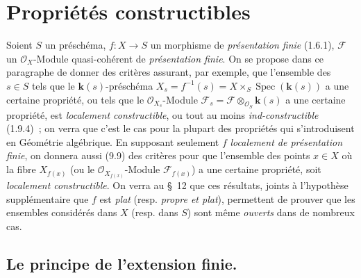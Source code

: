 \section{Propriétés constructibles}
\label{section:IV.9-fr}

Soient $S$ un préschéma, $f:X\to S$ un morphisme de
\emph{présentation finie} (1.6.1), $\mathcal F$ un $\mathcal O_X$-Module
quasi-cohérent de \emph{présentation finie}. On se propose dans ce paragraphe
de donner des critères assurant, par exemple, que l'ensemble des $s\in S$ tels
que le $\boldsymbol{k}(s)$-préschéma
$X_s=f^{-1}(s)=X\times_S\operatorname{Spec}(\boldsymbol{k}(s))$ a une certaine propriété,
ou tels que le $\mathcal O_{X_s}$-Module
$\mathcal F_s=\mathcal F\otimes_{\mathcal O_S}\boldsymbol{k}(s)$ a une certaine propriété,
est \emph{localement constructible}, ou tout au moins
\emph{ind-constructible} (1.9.4)~; on verra que c'est le cas pour la plupart
des propriétés qui s'introduisent en Géométrie algébrique. En supposant
seulement $f$ \emph{localement de présentation finie}, on donnera aussi (9.9)
des critères pour que l'ensemble des points $x\in X$ où la fibre $X_{f(x)}$
(ou le $\mathcal O_{X_{f(x)}}$-Module $\mathcal F_{f(x)}$) a une certaine
propriété, soit \emph{localement constructible}. On verra au \S~12 que ces
résultats, joints à l'hypothèse supplémentaire que $f$ est \emph{plat}
(resp. \emph{propre et plat}), permettent de prouver que les ensembles
considérés dans $X$ (resp. dans $S$) sont même \emph{ouverts} dans de nombreux
cas.

\subsection{Le principe de l'extension finie.}
\label{subsection:IV.9.1-fr}

